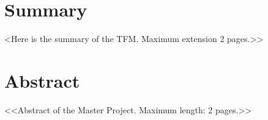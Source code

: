 \chapter*{Summary}

<Here is the summary of the TFM. Maximum extension 2 pages.>>

\newpage

\chapter*{Abstract}

<<Abstract of the Master Project. Maximum length: 2 pages.>>


